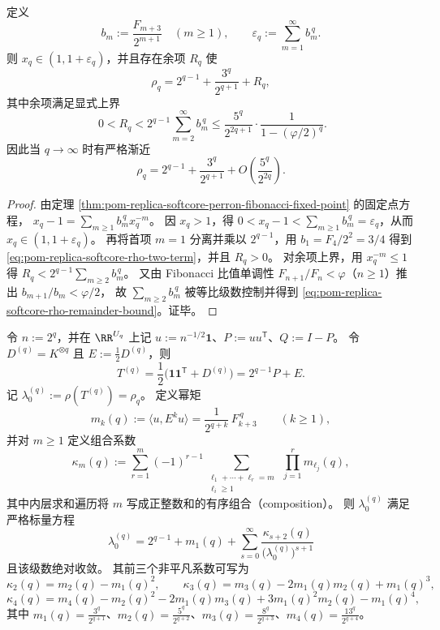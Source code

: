 \begin{corollary}\label{cor:pom-replica-softcore-rho-two-term-remainder}
定义
\[
b_m:=\frac{F_{m+3}}{2^{m+1}}\quad(m\ge 1),
\qquad
\varepsilon_q:=\sum_{m=1}^{\infty}b_m^{\,q}.
\]
则 \(x_q\in(1,1+\varepsilon_q)\)，并且存在余项 \(R_q\) 使
\begin{equation}\label{eq:pom-replica-softcore-rho-two-term}
\rho_q
=2^{q-1}+\frac{3^q}{2^{q+1}}+R_q,
\end{equation}
其中余项满足显式上界
\begin{equation}\label{eq:pom-replica-softcore-rho-remainder-bound}
\boxed{\;
0<R_q
<2^{q-1}\sum_{m=2}^{\infty}b_m^{\,q}
\le \frac{5^q}{2^{2q+1}}\cdot\frac{1}{1-(\varphi/2)^q}.}
\end{equation}
因此当 \(q\to\infty\) 时有严格渐近
\[
\rho_q
=2^{q-1}+\frac{3^q}{2^{q+1}}+O\!\left(\frac{5^q}{2^{2q}}\right).
\]
\end{corollary}
\begin{proof}
由定理 \ref{thm:pom-replica-softcore-perron-fibonacci-fixed-point} 的固定点方程，
\(
x_q-1=\sum_{m\ge 1}b_m^{\,q}x_q^{-m}
\)。
因 \(x_q>1\)，得 \(0<x_q-1<\sum_{m\ge 1}b_m^{\,q}=\varepsilon_q\)，从而 \(x_q\in(1,1+\varepsilon_q)\)。
再将首项 \(m=1\) 分离并乘以 \(2^{q-1}\)，用 \(b_1=F_4/2^2=3/4\) 得到 \eqref{eq:pom-replica-softcore-rho-two-term}，并且 \(R_q>0\)。
对余项上界，用 \(x_q^{-m}\le 1\) 得
\(
R_q<2^{q-1}\sum_{m\ge 2}b_m^{\,q}
\)。
又由 Fibonacci 比值单调性 \(F_{n+1}/F_n<\varphi\)（\(n\ge 1\)）推出
\(
b_{m+1}/b_m<\varphi/2
\)，
故 \(\sum_{m\ge 2}b_m^{\,q}\) 被等比级数控制并得到 \eqref{eq:pom-replica-softcore-rho-remainder-bound}。证毕。
\end{proof}

\begin{theorem}\label{thm:pom-replica-softcore-perron-feshbach-composition-moment-series}
令 \(n:=2^q\)，并在 \(\RR^{U_q}\) 上记 \(u:=n^{-1/2}\mathbf{1}\)、\(P:=uu^{\mathsf T}\)、\(Q:=I-P\)。
令 \(D^{(q)}=K^{\otimes q}\) 且 \(E:=\frac12D^{(q)}\)，则
\[
T^{(q)}=\frac12\bigl(\mathbf{1}\mathbf{1}^{\mathsf T}+D^{(q)}\bigr)=2^{q-1}P+E.
\]
记 \(\lambda_0^{(q)}:=\rho(T^{(q)})=\rho_q\)。
定义幂矩
\[
m_k(q):=\langle u,E^k u\rangle=\frac{1}{2^{q+k}}\,F_{k+3}^{\,q}\qquad(k\ge 1),
\]
并对 \(m\ge 1\) 定义组合系数
\[
\kappa_{m}(q):=\sum_{r=1}^{m}(-1)^{r-1}\!\!\sum_{\substack{\ell_1+\cdots+\ell_r=m\\ \ell_i\ge 1}}\ \prod_{j=1}^{r} m_{\ell_j}(q),
\]
其中内层求和遍历将 \(m\) 写成正整数和的有序组合（composition）。
则 \(\lambda_0^{(q)}\) 满足严格标量方程
\[
\boxed{\;
\lambda_0^{(q)}
=2^{q-1}+m_1(q)+\sum_{s=0}^{\infty}\frac{\kappa_{s+2}(q)}{\bigl(\lambda_0^{(q)}\bigr)^{s+1}}\;}
\]
且该级数绝对收敛。
其前三个非平凡系数可写为
\[
\kappa_2(q)=m_2(q)-m_1(q)^2,\qquad
\kappa_3(q)=m_3(q)-2m_1(q)m_2(q)+m_1(q)^3,
\]
\[
\kappa_4(q)=m_4(q)-m_2(q)^2-2m_1(q)m_3(q)+3m_1(q)^2m_2(q)-m_1(q)^4,
\]
其中
\(
m_1(q)=\frac{3^q}{2^{q+1}}
\)、\(
m_2(q)=\frac{5^q}{2^{q+2}}
\)、\(
m_3(q)=\frac{8^q}{2^{q+3}}
\)、\(
m_4(q)=\frac{13^q}{2^{q+4}}
\)。
\end{theorem}

